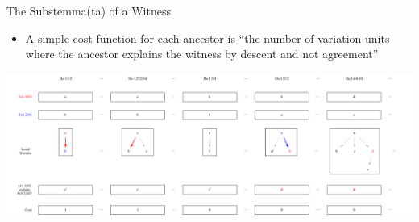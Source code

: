\documentclass[10pt]{beamer}
\begin{document}
	\begin{frame}{The Substemma(ta) of a Witness}
		\begin{itemize}
			\item A simple cost function for each ancestor is ``the number of variation units where the ancestor explains the witness by descent and not agreement''
		\end{itemize}
		\begin{center}
			\includegraphics[width=\textwidth]{../graphics/explained-readings-costs.pdf}
		\end{center}
	\end{frame}
\end{document}
